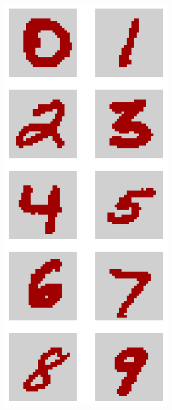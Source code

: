 \begin{frame}
\begin{columns}[T]
      \includegraphics[width=0.8\textwidth]{img/mnist-example.pdf}
  \end{columns}
\end{frame}


